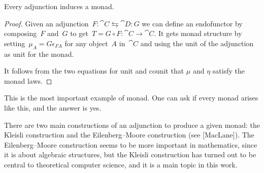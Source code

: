 \documentclass[../TFG.tex]{subfiles}
\begin{document}
\begin{proposition}
    Every adjunction induces a monad.
\end{proposition}
\begin{proof}
    Given an adjunction~\(F:\cat{C}\leftrightarrows\cat{D}:G\) we can define an
    endofunctor by composing~\(F\) and~\(G\) to get~\(T = G \circ
    F:\cat{C}\longrightarrow\cat{C}\). It gets monad structure by
    setting~\(\mu_{A} = G \epsilon_{FA}\) for any object~\(A\) in~\(\cat{C}\)
    and using the unit of the adjunction as unit for the monad.

    It follows from the two equations for unit and counit that $\mu$ and $\eta$
    satisfy the monad laws.
\end{proof}
This is the most important example of monad. One can ask if every monad arises
like this, and the answer is yes.

There are two main constructions of an adjunction to produce a given monad: the
Kleisli construction and the Eilenberg--Moore construction (see [MacLane]).
The Eilenberg--Moore construction seems to be more important in mathematics,
since it is about algebraic structures, but the Kleisli construction has turned
out to be central to theoretical computer science, and it is a main topic in
this work.

\end{document}
